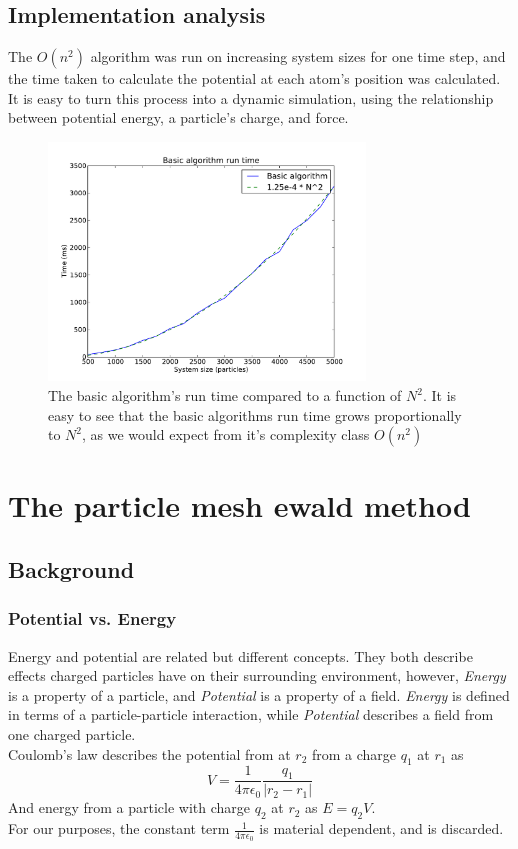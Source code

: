 \documentclass[pdftex,twoside,a4paper]{report}
\newcommand{\bcen}{\begin{center}}
\newcommand{\ecen}{\end{center}}
\begin{document}
\subsection{Implementation analysis}
The $O(n^2)$ algorithm was run on increasing system sizes for one time step, and the time taken to calculate the potential at each atom's position was calculated. It is easy to turn this process into a dynamic simulation, using the relationship between potential energy, a particle's charge, and force.
\begin{figure}[H]
\bcen \includegraphics[width=0.75\textwidth]{figures/graphs/basic_algo_complex.pdf} \ecen
\caption{The basic algorithm's run time compared to a function of $N^2$. It is easy to see that the basic algorithms run time grows proportionally to $N^2$, as we would expect from it's complexity class $O(n^2)$}
\label{fig:basic_algo_complex}
\end{figure}

\section{The particle mesh ewald method}
\subsection{Background}
\subsubsection{Potential vs. Energy}
Energy and potential are related but different concepts. They both describe effects charged particles have on their surrounding environment, however, \emph{Energy} is a property of a particle, and \emph{Potential} is a property of a field. \emph{Energy} is defined in terms of a particle-particle interaction, while \emph{Potential} describes a field from one charged particle.\\
Coulomb's law describes the potential from at $r_2$ from a charge $q_1$ at $r_1$ as 
\[V=\frac{1}{4\pi \epsilon_0} \frac{q_1}{|r_2 - r_1|}\]
And energy from a particle with charge $q_2$ at $r_2$ as $E = q_2 V$.\\
For our purposes, the constant term $\frac{1}{4\pi \epsilon_0}$ is material dependent, and is discarded.
\end{document}
